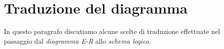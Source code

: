 \section{Traduzione del diagramma}\label{sec:translation}
In questo paragrafo discutiamo alcune scelte di traduzione effettuate nel passaggio
dal {\it diagramma E-R} allo {\it schema logico}.

